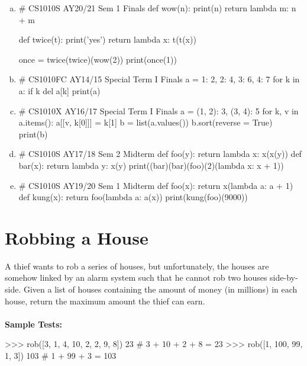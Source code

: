 \begin{enumerate}[(a)]
\item
\begin{python}
# CS1010S AY20/21 Sem 1 Finals
def wow(n):
    print(n)
    return lambda m: n + m

def twice(t):
    print('yes')
    return lambda x: t(t(x))

once = twice(twice)(wow(2))
print(once(1))
\end{python}

\item
\begin{python}
# CS1010FC AY14/15 Special Term I Finals
a = {1: 2, 2: 4, 3: 6, 4: 7}
for k in a:
    if k %
        del a[k]
print(a)
\end{python}

\item
\begin{python}
# CS1010X AY16/17 Special Term I Finals
a = {(1, 2): 3, (3, 4): 5}
for k, v in a.items():
    a[[v, k[0]]] = k[1]
b = list(a.values())
b.sort(reverse = True)
print(b)
\end{python}

\item
\begin{python}
# CS1010S AY17/18 Sem 2 Midterm
def foo(y):
    return lambda x: x(x(y))
def bar(x):
    return lambda y: x(y)
print((bar)(bar)(foo)(2)(lambda x: x + 1))
\end{python}

\item
\begin{python}
# CS1010S AY19/20 Sem 1 Midterm
def foo(x):
    return x(lambda a: a + 1)
def kung(x):
    return foo(lambda a: a(x))
print(kung(foo)(9000))
\end{python}
\end{enumerate}

\section{Robbing a House}
A thief wants to rob a series of houses, but unfortunately, the houses are somehow
linked by an alarm system such that he cannot rob two houses side-by-side. Given a list
of houses containing the amount of money (in millions) in each house, return the
maximum amount the thief can earn. \\ \\
\textbf{Sample Tests:}
\begin{python}
>>> rob([3, 1, 4, 10, 2, 2, 9, 8])
23  # 3 + 10 + 2 + 8 = 23
>>> rob([1, 100, 99, 1, 3])
103 # 1 + 99 + 3 = 103
\end{python}

